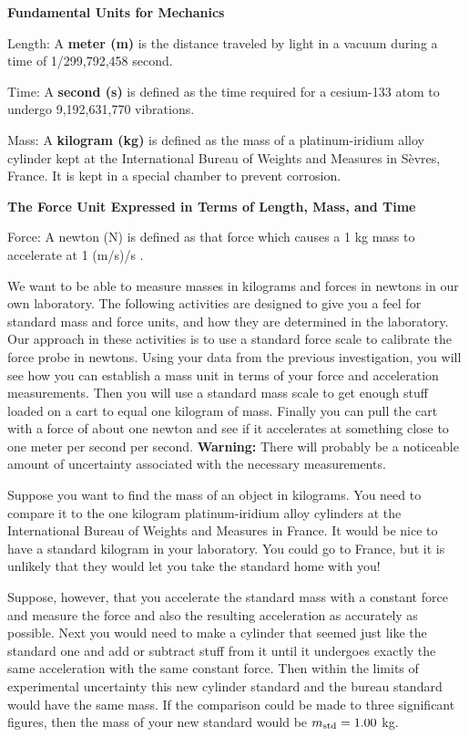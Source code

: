 \textbf{Fundamental Units for Mechanics }

Length: A \textbf{meter (m)} is the distance traveled by light in a vacuum during
a time of 1/299,792,458 second. 

Time: A \textbf{second (s)} is defined as the time required for a cesium-133
atom to undergo 9,192,631,770 vibrations. 

Mass: A \textbf{kilogram (kg)} is defined as the mass of a platinum-iridium
alloy cylinder kept at the International Bureau of Weights and Measures in S\`evres,
France. It is kept in a special chamber to prevent corrosion.

\textbf{The Force Unit Expressed in Terms of Length, Mass, and Time} 

Force: A newton (N) is defined as that force which causes a 1 kg mass to accelerate
at 1 (m/s)/s . 

We want to be able to measure masses in kilograms and forces in newtons in our
own laboratory. The following activities are designed to give you a feel for
standard mass and force units, and how they are determined in the laboratory.
Our approach in these activities is to use a standard force scale to calibrate
the force probe in newtons. Using your data from the previous investigation,
you will see how you can establish a mass unit in terms of your force and acceleration
measurements. Then you will use a standard mass scale to get enough stuff loaded
on a cart to equal one kilogram of mass. Finally you can pull the cart with
a force of about one newton and see if it accelerates at something close to
one meter per second per second. \textbf{Warning:} There will probably be a
noticeable amount of uncertainty associated with the necessary measurements.

Suppose you want to find the mass of an object in kilograms. You need to compare
it to the one kilogram platinum-iridium alloy cylinders at the International
Bureau of Weights and Measures in France. It would be nice to have a standard
kilogram in your laboratory. You could go to France, but it is unlikely that
they would let you take the standard home with you!

Suppose, however, that you accelerate the standard mass with a constant force
and measure the force and also the resulting acceleration as accurately as possible.
Next you would need to make a cylinder that seemed just like the standard one
and add or subtract stuff from it until it undergoes exactly the same acceleration
with the same constant force. Then within the limits of experimental uncertainty
this new cylinder standard and the bureau standard would have the same mass.
If the comparison could be made to three significant figures, then the mass
of your new standard would be \( m_{\rm std}  = 1.00\) kg.

